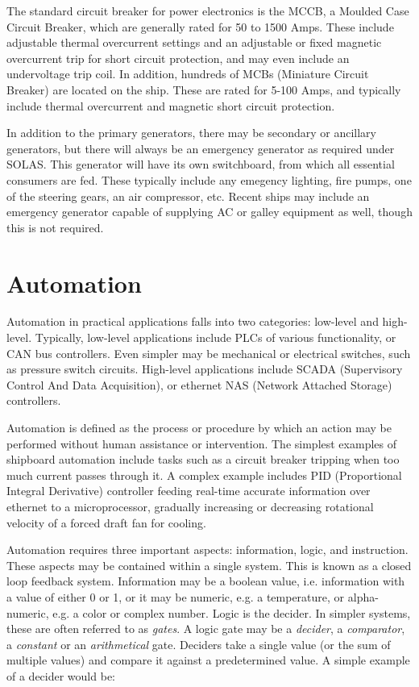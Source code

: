 \documentclass[11pt,a4paper]{article}
\begin{document}
The standard circuit breaker for power electronics is the MCCB, a Moulded Case Circuit Breaker, which are generally rated for 50 to 1500 Amps. These include adjustable thermal overcurrent settings and an adjustable or fixed magnetic overcurrent trip for short circuit protection, and may even include an undervoltage trip coil. In addition, hundreds of MCBs (Miniature Circuit Breaker) are located on the ship. These are rated for 5-100 Amps, and typically include thermal overcurrent and magnetic short circuit protection.

In addition to the primary generators, there may be secondary or ancillary generators, but there will always be an emergency generator as required under SOLAS. This generator will have its own switchboard, from which all essential consumers are fed. These typically include any emegency lighting, fire pumps, one of the steering gears, an air compressor, etc. Recent ships may include an emergency generator capable of supplying AC or galley equipment as well, though this is not required.\cite[p. 19]{e11}

\section{Automation}
Automation in practical applications falls into two categories: low-level and high-level. Typically, low-level applications include PLCs of various functionality, or CAN bus controllers. Even simpler may be mechanical or electrical switches, such as pressure switch circuits. High-level applications include SCADA (Supervisory Control And Data Acquisition), or ethernet NAS (Network Attached Storage) controllers.

Automation is defined as the process or procedure by which an action may be performed without human assistance or intervention. The simplest examples of shipboard automation include tasks such as a circuit breaker tripping when too much current passes through it. A complex example includes PID (Proportional Integral Derivative) controller feeding real-time accurate information over ethernet to a microprocessor, gradually increasing or decreasing rotational velocity of a forced draft fan for cooling.

Automation requires three important aspects: information, logic, and instruction. These aspects may be contained within a single system. This is known as a closed loop feedback system. Information may be a boolean value, i.e. information with a value of either 0 or 1, or it may be numeric, e.g. a temperature, or alpha-numeric, e.g. a color or complex number. Logic is the decider. In simpler systems, these are often referred to as \textit{gates}. A logic gate may be a \textit{decider}, a \textit{comparator}, a \textit{constant} or an \textit{arithmetical} gate. Deciders take a single value (or the sum of multiple values) and compare it against a predetermined value. A simple example of a decider would be:
\end{document}
